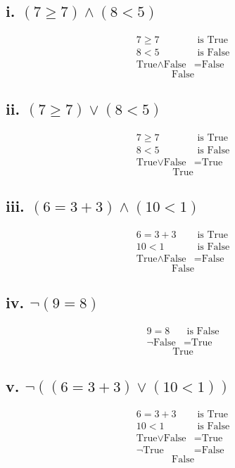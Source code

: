 \documentclass{article}
\begin{document}
\subsection*{i. $(7 \geq 7) \land (8 < 5)$}
\begin{align*}
7 \geq 7 &\text{ is True} \\
8 < 5 &\text{ is False} \\
\text{True} \land \text{False} &= \text{False}
\end{align*}
\[
\text{False}
\]

\subsection*{ii. $(7 \geq 7) \lor (8 < 5)$}
\begin{align*}
7 \geq 7 &\text{ is True} \\
8 < 5 &\text{ is False} \\
\text{True} \lor \text{False} &= \text{True}
\end{align*}
\[
\text{True}
\]

\subsection*{iii. $(6 = 3 + 3) \land (10 < 1)$}
\begin{align*}
6 = 3 + 3 &\text{ is True} \\
10 < 1 &\text{ is False} \\
\text{True} \land \text{False} &= \text{False}
\end{align*}
\[
\text{False}
\]

\subsection*{iv. $\neg(9 = 8)$}
\begin{align*}
9 = 8 &\text{ is False} \\
\neg \text{False} &= \text{True}
\end{align*}
\[
\text{True}
\]

\subsection*{v. $\neg((6 = 3 + 3) \lor (10 < 1))$}
\begin{align*}
6 = 3 + 3 &\text{ is True} \\
10 < 1 &\text{ is False} \\
\text{True} \lor \text{False} &= \text{True} \\
\neg \text{True} &= \text{False}
\end{align*}
\[
\text{False}
\]
\newpage
\end{document}

